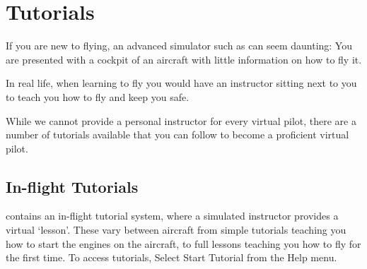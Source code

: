 
\chapter{Tutorials}
\label{tutorials}

If you are new to flying, an advanced simulator such as \FlightGear{} can seem
daunting: You are presented with a cockpit of an aircraft with little 
information on how to fly it.

In real life, when learning to fly you would have an instructor sitting next to
you to teach you how to fly and keep you safe.

While we cannot provide a personal instructor for every virtual pilot, there are
a number of tutorials available that you can follow to become a proficient
virtual pilot.

\section{In-flight Tutorials}

\FlightGear{} contains an in-flight tutorial system, where a simulated 
instructor provides a virtual `lesson'. These vary between aircraft from
 simple tutorials teaching you how to start the engines on the aircraft,
to full lessons teaching you how to fly for the first time.
To access tutorials, Select Start Tutorial from the Help menu. 

